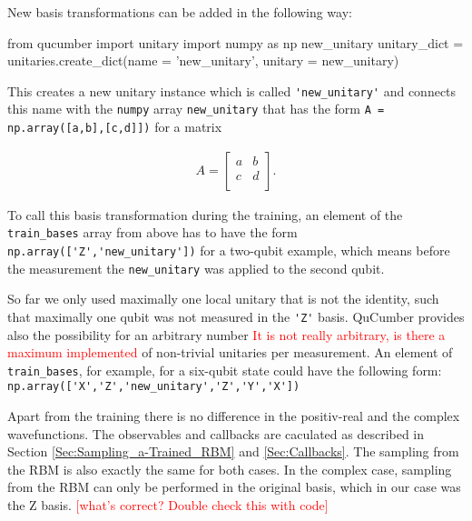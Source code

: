 \documentclass[submission, Phys]{SciPost}
\begin{document}
New basis transformations can be added in the following way:

\begin{python}
	from qucumber import unitary
	import numpy as np
	new_unitary
	unitary_dict = unitaries.create_dict(name = 'new_unitary', unitary = new_unitary)
\end{python}

This creates a new unitary instance which is called \verb|'new_unitary'| and connects this name with the \verb|numpy| array
\verb|new_unitary| that has the form \verb|A = np.array([a,b],[c,d]])| for a matrix

\begin{align}
	A =
	\begin{bmatrix}
		a & b \\
		c & d \\
	\end{bmatrix}.
\end{align}

To call this basis transformation during the training, an element of the \verb|train_bases| array from above has to have the form
\verb|np.array(['Z','new_unitary'])| for a two-qubit example,
which means before the measurement the \verb|new_unitary| was applied to the second qubit.

So far we only used maximally one local unitary that is not the identity, such that maximally one qubit was not measured in the \verb|'Z'| basis.
QuCumber provides also the possibility for an arbitrary number \textcolor{red}{It is not really arbitrary, is there a maximum implemented} of non-trivial unitaries per measurement.
An element of \verb|train_bases|, for example, for a six-qubit state could have the following form:
\verb|np.array(['X','Z','new_unitary','Z','Y','X'])|

Apart from the training there is no difference in the positiv-real and the complex wavefunctions. The observables and callbacks are caculated as described in Section \ref{Sec:Sampling_a-Trained_RBM} and \ref{Sec:Callbacks}.
The sampling from the RBM is also exactly the same for both cases.
In the complex case, sampling from the RBM can only be performed in the original basis, which in our case was the Z basis.
\textcolor{red}{[what's correct? Double check this with code]}
%
\end{document}
